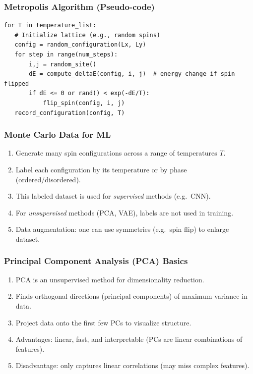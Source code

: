 \documentclass{beamer}
\begin{document}
\begin{frame}
\frametitle{Metropolis Algorithm (Pseudo-code)}

\begin{verbatim}
for T in temperature_list:
   # Initialize lattice (e.g., random spins)
   config = random_configuration(Lx, Ly)
   for step in range(num_steps):
       i,j = random_site()
       dE = compute_deltaE(config, i, j)  # energy change if spin flipped
       if dE <= 0 or rand() < exp(-dE/T):
           flip_spin(config, i, j)
   record_configuration(config, T)

\end{verbatim}
\end{frame}

\begin{frame}
\frametitle{Monte Carlo Data for ML}

\begin{enumerate}
\item Generate many spin configurations across a range of temperatures $T$.

\item Label each configuration by its temperature or by phase (ordered/disordered).

\item This labeled dataset is used for \emph{supervised} methods (e.g.\ CNN).

\item For \emph{unsupervised} methods (PCA, VAE), labels are not used in training.

\item Data augmentation: one can use symmetries (e.g.\ spin flip) to enlarge dataset.
\end{enumerate}

\noindent
\end{frame}

\begin{frame}
\frametitle{Principal Component Analysis (PCA) Basics}

\begin{enumerate}
\item PCA is an unsupervised method for dimensionality reduction.

\item Finds orthogonal directions (principal components) of maximum variance in data.

\item Project data onto the first few PCs to visualize structure.

\item Advantages: linear, fast, and interpretable (PCs are linear combinations of features).

\item Disadvantage: only captures linear correlations (may miss complex features).
\end{enumerate}

\noindent
\end{frame}
\end{document}
